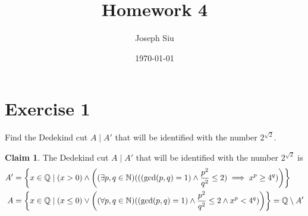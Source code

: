 \documentclass{homework}
\author{Joseph Siu}
\date{\today}
\title{Homework 4}
\newcommand{\Q}{\bb{Q}} %
\newcommand{\N}{\bb{N}} %
\newcommand{\?}{\stackrel{?}{=}}
\theoremstyle{definition}
\newtheorem*{claim}{Claim}
\begin{document}
 \maketitle


\section*{Exercise 1}
\question Find the Dedekind cut $A\mid A'$ that will be identified with the number $2^{\sqrt{2}}$. 

\begin{claim}
    The Dedekind cut $A\mid A'$ that will be identified with the number $2^{\sqrt{2}}$ is \begin{alignat*}{1}
        A'&=\left\{x\in\Q\mid (x>0)\land\left((\exists p, q\in \N)(((\gcd(p,q)=1)\land\frac{p^2}{q^2}\leq2)\implies x^p\geq4^q)\right)\right\}\\
        A&=\left\{x\in\Q\mid (x\leq0)\lor\left((\forall p, q\in \N)((\gcd(p,q)=1)\land\frac{p^2}{q^2}\leq2\land x^p<4^q)\right)\right\}=\Q\setminus A'
    \end{alignat*}
    
\end{claim}
\end{document}
